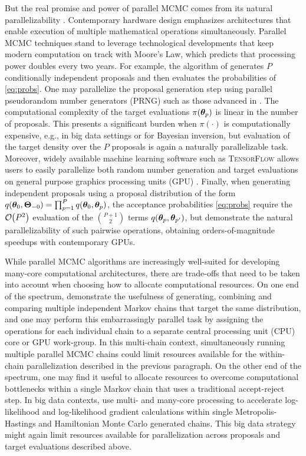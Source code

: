 \documentclass[12pt]{article} %
\newcommand{\order}[1]{{\cal O}\hspace{-0.2em}\left( #1 \right)}
\begin{document}
But the real promise and power of parallel MCMC comes from its natural parallelizability \citep{calderhead2014general}.  Contemporary hardware design emphasizes architectures that enable execution of multiple mathematical operations simultaneously. Parallel MCMC techniques stand to leverage technological developments that keep modern computation on track with Moore's Law, which predicts that processing power doubles every two years.  For example, the algorithm of \citet{tjelmeland2004using} generates $P$ conditionally independent proposals and then evaluates the probabilities of \eqref{eq:probs}.  One may parallelize the proposal generation step using parallel pseudorandom number generators (PRNG) such as those advanced in \citet{salmon2011parallel}. The computational complexity of the target evaluations $\pi(\boldsymbol{\theta}_p)$ is linear in the number of proposals. This presents a significant burden when $\pi(\cdot)$ is computationally expensive, e.g., in big data settings or for Bayesian inversion, but evaluation of the target density over the $P$ proposals is again a naturally parallelizable task.  Moreover, widely available machine learning software such as \textsc{TensorFlow} allows users to easily parallelize both random number generation and target evaluations on general purpose graphics processing units (GPU) \citep{lao2020tfp}. Finally, when generating independent proposals using a proposal distribution of the form $q(\boldsymbol{\theta}_0,\boldsymbol{\Theta}_{-0})=\prod_{p=1}^Pq(\boldsymbol{\theta}_0,\boldsymbol{\theta}_{p})$, the acceptance probabilities \eqref{eq:probs} require the $\order{P^2}$ evaluation of the $P+1\choose 2$ terms $q(\boldsymbol{\theta}_{p},\boldsymbol{\theta}_{p'})$, but \citet{massive,holbrook2021scalable} demonstrate the natural parallelizability of such pairwise operations, obtaining orders-of-magnitude speedups with contemporary GPUs.




While parallel MCMC algorithms are increasingly well-suited for developing many-core computational architectures, there are trade-offs that need to be taken into account when choosing how to allocate computational resources.  On one end of the spectrum, \citet{gelman1992inference} demonstrate the usefulness of generating, combining and comparing multiple independent Markov chains that target the same distribution, and one may perform this embarrassingly parallel task by assigning the operations for each individual chain to a separate central processing unit (CPU) core or GPU work-group.  In this multi-chain context, simultaneously running multiple parallel MCMC chains could limit resources available for the within-chain parallelization described in the previous paragraph.  On the other end of the spectrum, one may find it useful to allocate resources to overcome computational bottlenecks within a single Markov chain that uses a traditional accept-reject step. In big data contexts, \citet{massive,holbrook2021scalable,holbrook2022bayesian,holbrook2022viral} use multi- and many-core processing to accelerate log-likelihood and log-likelihood gradient calculations within single Metropolis-Hastings and Hamiltonian Monte Carlo \citep{neal2011mcmc} generated chains.  This big data strategy might again limit resources available for parallelization across proposals and target evaluations described above.
\end{document}

